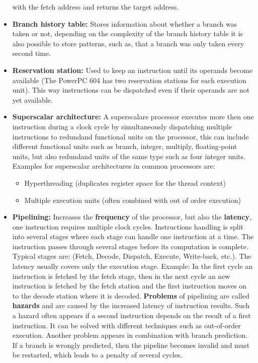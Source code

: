 \documentclass[a4paper,10pt]{article}
\begin{document}
\begin{itemize}
       with the fetch address and returns the target address.
 \item \textbf{Branch history table:} Stores information about whether a branch was taken or not, depending on the complexity of the 
       branch history table it is also possible to store patterns, such as, that a branch was only taken every second time.
 \item \textbf{Reservation station:}  Used to keep an instruction until its operands become available (The PowerPC 604 has two 
       reservation stations for each execution unit). This way instructions can be dispatched even if their operands are not yet 
       available.
 \item \textbf{Superscalar architecture:} A superscalare processor executes more then one instruction during a clock cycle by 
       simultaneously dispatching multiple instructions to redundand functional units on the processor, this can include different 
       functional units such as branch, integer, multiply, floating-point units, but also redundand units
       of the same type such as four integer units. Examples for superscalar architectures in common processors are:
	\begin{itemize}
	    \item Hyperthreading (duplicates register space for the thread context)
	    \item Multiple execution units (often combined with out of order execution)
	\end{itemize}
  \item \textbf{Pipelining:} Increases the \textbf{frequency} of the processor, but also the \textbf{latency}, one instruction requires
multiple clock cycles. Instructions handling is split into several stages where each stage can handle one instruction at a time. The 
instruction passes through several stages before its computation is complete. Typical stages are: (Fetch, Decode, Dispatch, Execute, 
Write-back, etc.). The latency usually covers only the execution stage. Example: In the first cycle an instruction is fetched by the 
fetch stage, then in the next cycle an new instruction is fetched by the fetch station and the first instruction moves on to the decode 
station where it is decoded. \textbf{Problems} of pipelining are called \textbf{hazards} and are caused by the increased latency of 
instruction results. Such a hazard often appears if a second instruction depends on the result of a first instruction. It can be solved 
with different techniques such as out-of-order execution. Another problem appears in combination with branch prediction. If a branch is 
wrongly predicted, then the pipeline becomes invalid and must be restarted, which leads to a penalty of several cycles.
\end{itemize}
\end{document}
